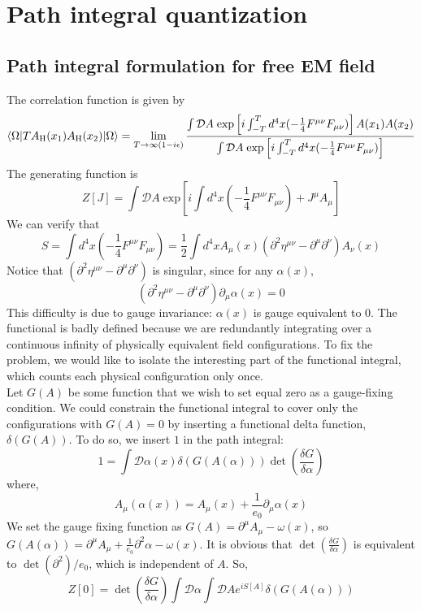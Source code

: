 \section{Path integral quantization}
\subsection{Path integral formulation for free EM field}
\noindent
The correlation function is given by
\[\langle \Omega | T A_{\rm H}(x_1) A_{\rm H}(x_2)| \Omega \rangle = \lim_{T \to \infty(1-i\epsilon)} \frac{\int \mathcal{D}A \; \mathrm{exp} \left[ i\int_{-T}^T d^4x (-\frac{1}{4} F^{\mu\nu}F_{\mu\nu}) \right] A(x_1) A(x_2)}{\int \mathcal{D}A \; \mathrm{exp} \left[ i\int_{-T}^T d^4x (-\frac{1}{4} F^{\mu\nu}F_{\mu\nu}) \right]}\]
The generating function is 
\[Z[J] = \int \mathcal{D}A \; \mathrm{exp} \left[ i\int d^4x (-\frac{1}{4} F^{\mu\nu}F_{\mu\nu}) + J^{\mu} A_{\mu} \right]\]
We can verify that
\[S = \int d^4x (-\frac{1}{4} F^{\mu\nu}F_{\mu\nu}) = \frac{1}{2} \int d^4x A_{\mu}(x) (\partial^2\eta^{\mu\nu} - \partial^{\mu}\partial^{\nu})A_{\nu}(x)\]
Notice that $(\partial^2\eta^{\mu\nu} - \partial^{\mu}\partial^{\nu})$ is singular, since for any $\alpha(x)$, 
\[(\partial^2\eta^{\mu\nu} - \partial^{\mu}\partial^{\nu})\partial_{\mu}\alpha(x) = 0\]
This difficulty is due to gauge invariance: $\alpha(x)$ is gauge equivalent to $0$. The functional is badly defined because we are redundantly integrating over a continuous infinity of physically equivalent field configurations. To fix the problem, we would like to isolate the interesting part of the functional integral, which counts each physical configuration only once. \\
Let $G(A)$ be some function that we wish to set equal zero as a gauge-fixing condition. We could constrain the functional integral to cover only the configurations with $G(A) = 0$ by inserting a functional delta function, $\delta(G(A))$. To do so, we insert $1$ in the path integral:
\[ 1 = \int \mathcal{D}\alpha(x) \delta(G(A(\alpha))) \det \left( \frac{\delta G}{\delta \alpha} \right)\]
where,
\[A_{\mu}(\alpha(x)) = A_{\mu}(x) + \frac{1}{e_0}\partial_{\mu}\alpha(x)\]
We set the gauge fixing function as $G(A) = \partial^{\mu} A_{\mu} -\omega(x)$, so $G(A(\alpha)) = \partial^{\mu} A_{\mu} + \frac{1}{e_0}\partial^2 \alpha - \omega(x)$. It is obvious that $\det \left( \frac{\delta G}{\delta \alpha} \right)$ is equivalent to $\det(\partial^2)/e_0$, which is independent of $A$. So,
\[Z[0] = \det \left( \frac{\delta G}{\delta \alpha} \right) \int \mathcal{D}\alpha \int \mathcal{D}A e^{iS[A]} \delta(G(A(\alpha)))\]
